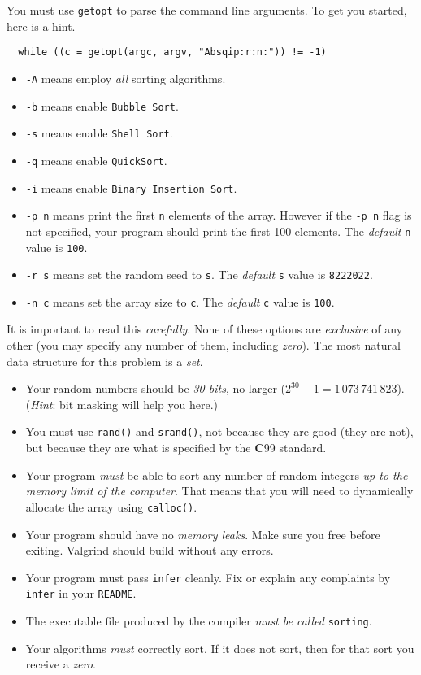 \documentclass[11pt]{article}
\begin{document}
You must use \texttt{getopt} to parse the command line arguments. To get you
started, here is a hint.
\begin{lstlisting}
  while ((c = getopt(argc, argv, "Absqip:r:n:")) != -1)
\end{lstlisting}
\begin{itemize}
  \item \texttt{-A} means employ \emph{all} sorting algorithms.
  \item \texttt{-b} means enable \texttt{Bubble Sort}.
  \item \texttt{-s} means enable \texttt{Shell Sort}.
  \item \texttt{-q} means enable \texttt{QuickSort}.
  \item \texttt{-i} means enable \texttt{Binary Insertion Sort}.
  \item \texttt{-p n} means print the first \texttt{n} elements of the array. However if the \texttt{-p n} flag is not specified, your program should print the first 100 elements.
  The \emph{default} \texttt{n} value is \texttt{100}.
  \item \texttt{-r s} means set the random seed to \texttt{s}. The
  \emph{default} \texttt{s} value is \texttt{8222022}.
  \item \texttt{-n c} means set the array size to \texttt{c}.
  The \emph{default} \texttt{c} value is \texttt{100}.
\end{itemize}
It is important to read this \emph{carefully}. None of these options are
\emph{exclusive} of any other (you may specify any number of them,
including \emph{zero}). The most natural data structure for this
problem is a \emph{set}.

\begin{itemize}
  \item Your random numbers should be \emph{30 bits}, no larger ($2^{30}-1 =
  1\,073\,741\,823$). (\emph{Hint}: bit masking will help you here.)
  \item You must use \texttt{rand()} and \texttt{srand()}, not because they are
  good (they are not), but because they are what is specified by the
  \textbf{C}99 standard.
  \item Your program \emph{must} be able to sort any number of random integers
  \emph{up to the memory limit of the computer}. That means that you will need
  to dynamically allocate the array using \texttt{calloc()}.
  \item Your program should have no \emph{memory leaks}. Make sure you free before exiting. Valgrind should build without any errors.
  \item Your program must pass \texttt{infer} cleanly. Fix or explain any complaints by \texttt{infer} in your \texttt{README}.
  \item The executable file produced by the compiler \emph{must be called}
  \texttt{sorting}.
  \item Your algorithms \emph{must} correctly sort. If it does not sort, then for that sort you receive a \emph{zero}.
\end{itemize}
\end{document}
